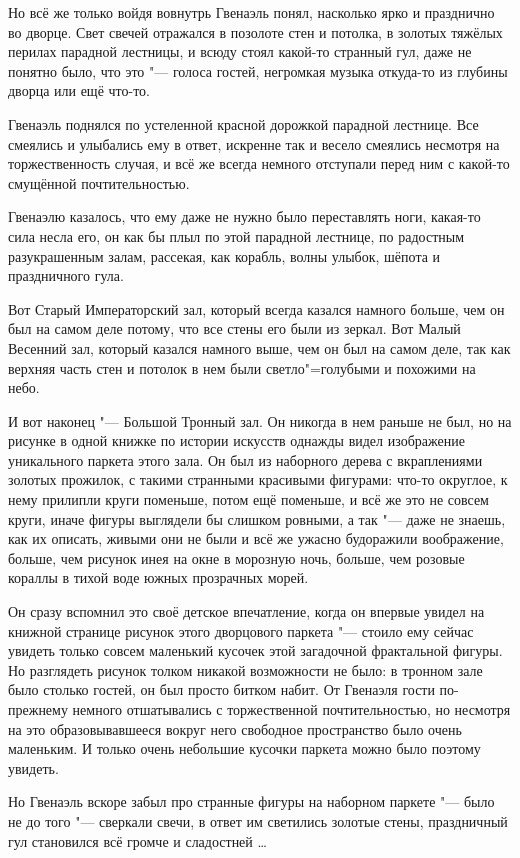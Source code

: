 Но всё же только войдя вовнутрь Гвенаэль понял, насколько ярко и празднично во
дворце.
Свет свечей отражался в позолоте стен и потолка, в золотых тяжёлых перилах
парадной лестницы, и всюду стоял какой-то странный гул, даже не понятно было,
что это "--- голоса гостей, негромкая музыка откуда-то из глубины дворца или ещё
что-то.

Гвенаэль поднялся по устеленной красной дорожкой парадной лестнице.
Все смеялись и улыбались ему в ответ, искренне так и весело смеялись несмотря на
торжественность случая, и всё же всегда немного отступали перед ним с какой-то
смущённой почтительностью.

Гвенаэлю казалось, что ему даже не нужно было переставлять ноги, какая-то сила
несла его, он как бы плыл по этой парадной лестнице, по радостным разукрашенным
залам, рассекая, как корабль, волны улыбок, шёпота и праздничного гула.

Вот Старый Императорский зал, который всегда казался намного больше, чем он был
на самом деле потому, что все стены его были из зеркал.
Вот Малый Весенний зал, который казался намного выше, чем он был на самом деле,
так как верхняя часть стен и потолок в нем были светло"=голубыми и похожими на
небо.

И вот наконец "--- Большой Тронный зал.
Он никогда в нем раньше не был, но на рисунке в одной книжке по истории искусств
однажды видел изображение уникального паркета этого зала.
Он был из наборного дерева с вкраплениями золотых прожилок, с такими странными
красивыми фигурами: что-то округлое, к нему прилипли круги поменьше, потом ещё
поменьше, и всё же это не совсем круги, иначе фигуры выглядели бы слишком
ровными, а так "--- даже не знаешь, как их описать, живыми они не были и всё же
ужасно будоражили воображение, больше, чем рисунок инея на окне в морозную ночь,
больше, чем розовые кораллы в тихой воде южных прозрачных морей.

Он сразу вспомнил это своё детское впечатление, когда он впервые увидел на
книжной странице рисунок этого дворцового паркета "--- стоило ему сейчас увидеть
только совсем маленький кусочек этой загадочной фрактальной фигуры.
Но разглядеть рисунок толком никакой возможности не было: в тронном зале было
столько гостей, он был просто битком набит. От Гвенаэля гости по-прежнему
немного отшатывались с торжественной почтительностью, но несмотря на это
образовывавшееся вокруг него свободное пространство было очень маленьким.
И только очень небольшие кусочки паркета можно было поэтому увидеть.

Но Гвенаэль вскоре забыл про странные фигуры на наборном паркете "--- было не до
того "--- сверкали свечи, в ответ им светились золотые стены, праздничный гул
становился всё громче и сладостней \ldots

